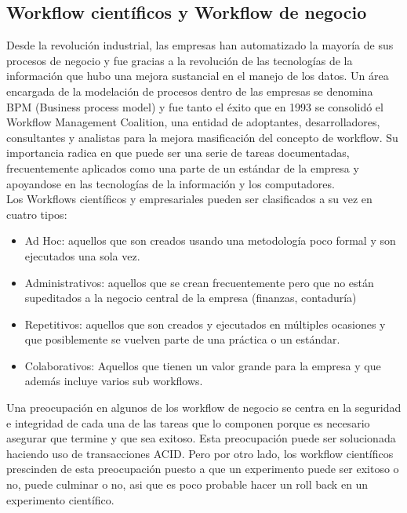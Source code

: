 \subsection{Workflow científicos y Workflow de negocio}

Desde la revolución industrial, las empresas han automatizado la mayoría de sus procesos de negocio y fue gracias a la revolución de las tecnologías de la información que hubo una mejora sustancial en el manejo de los datos. Un área encargada de la modelación de procesos dentro de las empresas se denomina BPM (Business process model) y fue tanto el éxito que en 1993 se consolidó el Workflow Management Coalition, una entidad de adoptantes, desarrolladores, consultantes y analistas para la mejora masificación del concepto de workflow. Su importancia radica en que puede ser una serie de tareas documentadas, frecuentemente aplicados como una parte de un estándar de la empresa y apoyandose en las tecnologías de la información y los computadores.\\

Los Workflows científicos y empresariales pueden ser clasificados  \cite{LeymanRoller} a su vez en cuatro tipos:

\begin{itemize}
\item Ad Hoc: aquellos que son creados usando una metodología poco formal y son ejecutados una sola vez.
\item Administrativos: aquellos que se crean frecuentemente pero que  no están supeditados a la negocio central de la empresa (finanzas, contaduría)
\item Repetitivos: aquellos que son creados y ejecutados en múltiples ocasiones y que posiblemente se vuelven parte de una práctica o un estándar.
\item Colaborativos: Aquellos que tienen un valor grande para la empresa y que además incluye varios sub workflows.
\end{itemize}

Una preocupación en algunos de los workflow de negocio se centra en la seguridad e integridad de cada una de las tareas que lo componen porque es necesario asegurar que termine y que sea exitoso. Esta preocupación puede ser solucionada haciendo uso de transacciones ACID. Pero por otro lado, los workflow científicos prescinden de esta preocupación puesto a que un experimento puede ser exitoso o no, puede culminar o no, asi que es poco probable hacer un roll back en un experimento científico. \\

